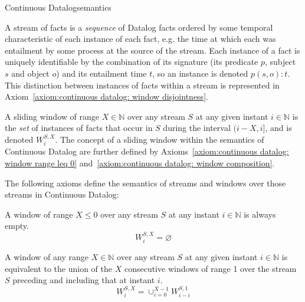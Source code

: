 \begin{nestedsection}{Continuous Datalog}{semantics}
	\begin{definition}\label{def:continuous datalog: stream}
		A stream of facts is a \emph{sequence} of Datalog facts ordered by some temporal characteristic of each instance of each fact, e.g. the time at which each was entailment by some process at the source of the stream.
		Each instance of a fact is uniquely identifiable by the combination of its signature (its predicate $p$, subject $s$ and object $o$) and its entailment time $t$, so an instance is denoted ${p(s,o):t}$.  This distinction between instances of facts within a stream is represented in Axiom~\ref{axiom:continuous datalog: window disjointness}.
	\end{definition}

	\begin{definition}\label{def:continuous datalog: window}
		A sliding window of range ${X \in \mathbb{N}}$ over any stream $S$ at any given instant ${i \in \mathbb{N}}$ is the \emph{set} of instances of facts that occur in $S$ during the interval ${(i-X,i]}$, and is denoted ${W^{S,X}_{i}}$.
		The concept of a sliding window within the semantics of Continuous Datalog are further defined by Axioms~\ref{axiom:continuous datalog: window range leq 0} and~\ref{axiom:continuous datalog: window composition}.
	\end{definition}

	The following axioms define the semantics of streams and windows over those streams in Continuous Datalog:

	\begin{axiom}\label{axiom:continuous datalog: window range leq 0}
		A window of range ${X \leq 0}$ over any stream $S$ at any instant ${i \in \mathbb{N}}$ is always empty.
		\begin{equation*}
			W^{S,X}_{i} = \varnothing
		\end{equation*}
	\end{axiom}

	\begin{axiom}\label{axiom:continuous datalog: window composition}
		A window of any range ${X \in \mathbb{N}}$ over any stream $S$ at any given instant ${i \in \mathbb{N}}$ is equivalent to the union of the $X$ consecutive windows of range 1 over the stream $S$ preceding and including that at instant $i$.
		\begin{equation*}
			W^{S,X}_{i} = \mathop{\cup}_{i=0}^{X-1} W^{S,1}_{i-i}
		\end{equation*}
	\end{axiom}


\end{nestedsection}
